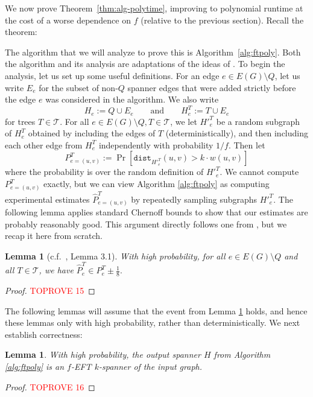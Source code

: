 \documentclass{article}
\theoremstyle{plain}
\newtheorem{lemma}[theorem]{Lemma}
\theoremstyle{definition}
\newcommand{\dist}{\texttt{dist}}
\newcommand{\tee}{\mathcal{T}}
\begin{document}
We now prove Theorem~\ref{thm:alg-polytime}, improving to polynomial runtime at the cost of a worse dependence on $f$ (relative to the previous section).  Recall the theorem:

\algpolytime*

The algorithm that we will analyze to prove this is Algorithm~\ref{alg:ftpoly}.  Both the algorithm and its analysis are adaptations of the ideas of \cite{BDR21}.
To begin the analysis, let us set up some useful definitions.
For an edge $e \in E(G) \setminus Q$, let us write $E_e$ for the subset of non-$Q$ spanner edges that were added strictly before the edge $e$ was considered in the algorithm.
We also write
$$H_e := Q \cup E_e \qquad \text{and} \qquad H_e^T := T \cup E_e$$
for trees $T \in \tee$.
For all $e \in E(G) \setminus Q, T \in \tee$, we let $H'^T_e$ be a random subgraph of $H_e^T$ obtained by including the edges of $T$ (deterministically), and then including each other edge from $H_e^T$ independently with probability $1/f$.
Then let
$$P^T_{e=(u, v)} := \Pr\left[ \dist_{H'^T_e}(u, v) > k \cdot w(u, v) \right]$$
where the probability is over the random definition of $H'^T_e$.
We cannot compute $P^T_{e=(u, v)}$ exactly, but we can view Algorithm \ref{alg:ftpoly} as computing experimental estimates $\widehat{P}^T_{e=(u, v)}$ by repeatedly sampling subgraphs $H'^T_e$.
The following lemma applies standard Chernoff bounds to show that our estimates are probably reasonably good.
This argument directly follows one from \cite{BDR21}, but we recap it here from scratch.

\begin{lemma} [c.f.~\cite{BDR21}, Lemma 3.1] \label{lem:whpguarantee}
With high probability, for all $e \in E(G) \setminus Q$ and all $T \in \mathcal{T}$, we have
$\widehat{P}^T_e \in P^T_e \pm \frac{1}{8}.$
\end{lemma}
\begin{proof}\textcolor{red}{TOPROVE 15}\end{proof}

The following lemmas will assume that the event from Lemma \ref{lem:whpguarantee} holds, and hence these lemmas only with high probability, rather than deterministically.
We next establish correctness:
\begin{lemma} \label{lem:poly-correct}
With high probability, the output spanner $H$ from Algorithm \ref{alg:ftpoly} is an $f$-EFT $k$-spanner of the input graph.
\end{lemma}
\begin{proof}\textcolor{red}{TOPROVE 16}\end{proof}
\end{document}
